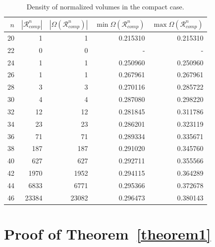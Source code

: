 \documentclass{amsart}
\begin{document}
\begin{table}[ht] \caption{Density of normalized volumes in the compact case.} \label{table2} 
\begin{tabular}{|r|r|r|r|r|} \hline
$n$ & $| \mathcal R^n_{comp}| $ & $ |\Omega(\mathcal R^n_{comp})|$ & $\min \Omega(\mathcal R^n_{comp})$ & $\max \Omega(\mathcal R^n_{comp})$  \\ \hline \hline 			
20 & 1 & 1 & 0.215310  & 0.215310 \\ \hline 
22 & 0 & 0 & - & -  \\ \hline 
24 & 1 & 1 & 0.250960  & 0.250960 \\ \hline 
26 & 1 & 1 & 0.267961 & 0.267961 \\ \hline
28 & 3 & 3 & 0.270116  & 0.285722 \\ \hline
30 & 4 & 4 & 0.287080  & 0.298220 \\ \hline
32 & 12 & 12 & 0.281845  & 0.311786 \\ \hline
34 & 23 & 23 & 0.286201 &0.323119  \\ \hline
36 & 71 & 71 & 0.289334 & 0.335671 \\ \hline
38 & 187 & 187 &  0.291020  & 0.345760 \\ \hline
40 & 627 & 627 & 0.292711 & 0.355566 \\ \hline
42 & 1970 & 1952 & 0.294115  & 0.364289  \\ \hline
44 & 6833 & 6771 & 0.295366 & 0.372678 \\ \hline
46 & 23384 & 23082 & 0.296473 & 0.380143 \\ \hline
\end{tabular}
\end{table}

\section{Proof of Theorem~\ref{theorem1}} \label{main-ideal}
\end{document}
